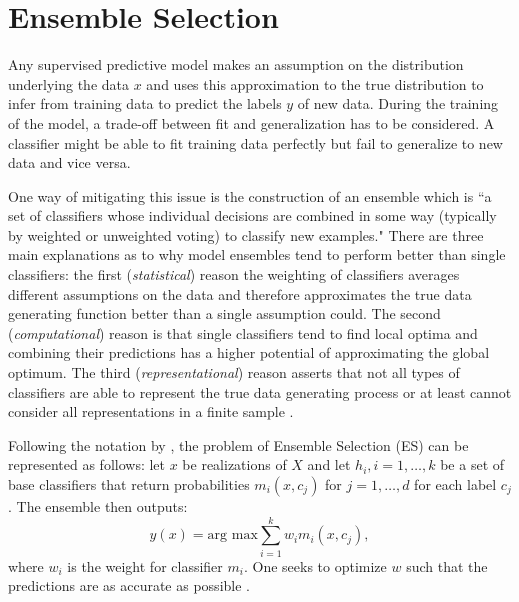 \section{Ensemble Selection}
\label{ES}
Any supervised predictive model makes an assumption on the distribution underlying the data $x$ and uses this approximation to the true distribution to infer from training data to predict the labels $y$ of new data. During the training of the model, a trade-off between fit and generalization has to be considered. A classifier might be able to fit training data perfectly but fail to generalize to new data and vice versa. 
 
One way of mitigating this issue is the construction of an ensemble which is ``a set of classifiers whose individual decisions are combined in some way (typically by weighted or unweighted voting) to classify new examples." \cite[p. 1]{dietterich2000ensemble} There are three main explanations as to why model ensembles tend to perform better than single classifiers: the first (\emph{statistical}) reason the weighting of classifiers averages different assumptions on the data and therefore approximates the true data generating function better than a single assumption could. The second (\emph{computational}) reason is that single classifiers tend to find local optima and combining their predictions has a higher potential of approximating the global optimum. The third (\emph{representational}) reason asserts that not all types of classifiers are able to represent the true data generating process or at least cannot consider all representations in a finite sample \cite[p. 2--3]{dietterich2000ensemble}. %

Following the notation by \cite{tsoumakas2008taxonomy}, the problem of Ensemble Selection (ES) can be represented as follows: let $x$ be realizations of $X$ and let $h_i, i=1,\dots,k$ be a set of base classifiers that return probabilities $m_i(x, c_j)$ for $j = 1,\dots,d$ for each label $c_j$. The ensemble then outputs:
\begin{equation}
y(x) = \text{arg max} \sum_{i=1}^{k} w_i m_i(x,c_j),
\end{equation}
where $w_i$ is the weight for classifier $m_i$. One seeks to optimize $w$ such that the predictions are as accurate as possible \cite[p. 2]{tsoumakas2008taxonomy}.

